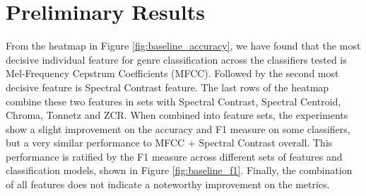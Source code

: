 \section{Preliminary Results}

\begin{figure*}
    
    \caption{Models vs. Features Sets and their Accuracy-measures on the validation set [0-100\%].}
    \label{fig:baseline_accuracy}
\end{figure*}

\begin{figure*}[tb!]
    
    \caption{Models vs. Features Sets and their F1-measures on the validation set [0-100\%].}
    \label{fig:baseline_f1}
\end{figure*}





From the heatmap in Figure \ref{fig:baseline_accuracy}, we have found that the most decisive individual feature for genre classification across the classifiers tested is Mel-Frequency Cepstrum Coefficients (MFCC). Followed by the second most decisive feature is Spectral Contrast feature. The last rows of the heatmap combine these two features in sets with Spectral Contrast, Spectral Centroid, Chroma, Tonnetz and ZCR. When combined into feature sets, the experiments show a slight improvement on the accuracy and F1 measure on some classifiers, but a very similar performance to MFCC + Spectral Contrast overall. This performance is ratified by the F1 measure across different sets of features and classification models, shown in Figure \ref{fig:baseline_f1}. Finally, the combination of all features does not indicate a noteworthy improvement on the metrics.
